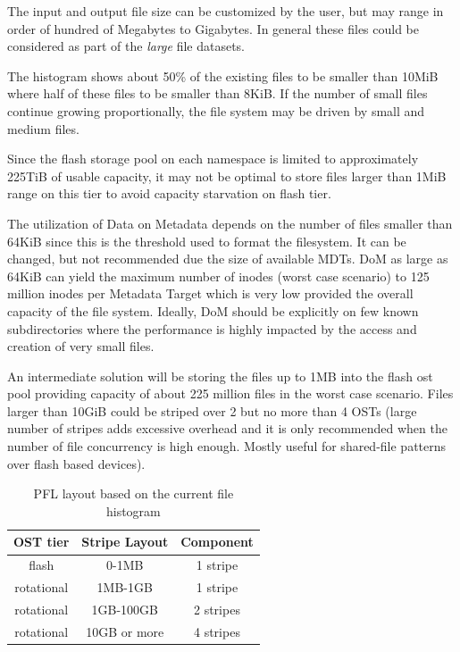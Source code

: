 \documentclass{article}
\begin{document}
The input and output file size can be customized by the user, but may range in order of hundred of Megabytes to Gigabytes. In general these files could be considered as part of the \textit{large} file datasets.

The histogram shows about 50\% of the existing files to be smaller than 10MiB where half of these files to be smaller than 8KiB. If the number of small files continue growing proportionally, the file system may be driven by small and medium files. 

Since the flash storage pool on each namespace is limited to approximately 225TiB of usable capacity, it may not be optimal to store files larger than 1MiB range on this tier to avoid capacity starvation on flash tier. 

The utilization of Data on Metadata depends on the number of files smaller than 64KiB since this is the threshold used to format the filesystem. It can be changed, but not recommended due the size of available MDTs. DoM as large as 64KiB can yield the maximum number of inodes (worst case scenario) to 125 million inodes per Metadata Target which is very low provided the overall capacity of the file system. Ideally, DoM should be explicitly on few known subdirectories where the performance is highly impacted by the access and creation of very small files. 

An intermediate solution will be storing the files up to 1MB into the flash ost pool providing capacity of about 225 million files in the worst case scenario. Files larger than 10GiB could be striped over 2 but no more than 4 OSTs (large number of stripes adds excessive overhead and it is only recommended when the number of file concurrency is high enough. Mostly useful for shared-file patterns over flash based devices). 

\begin{table}[h]
\centering
 \begin{tabular}{||c c c||} 
 \hline
 OST tier & Stripe Layout & Component \\ [0.5ex] 
 \hline\hline
 flash & 0-1MB & 1 stripe \\ 
 \hline
 rotational & 1MB-1GB & 1 stripe \\ 
 \hline
 rotational & 1GB-100GB & 2 stripes\\
 \hline
  rotational & 10GB or more & 4 stripes\\
 \hline
 \end{tabular}
 \caption{PFL layout based on the current file histogram}
 \label{tab:Proposed PFL layout}
\end{table}
\end{document}
